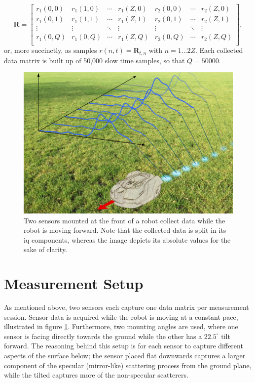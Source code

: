 \begin{equation}
	\mathbf{R}= 
	\begin{bmatrix}
		r_1(0,0) & r_1(1,0) & \cdots & r_1(Z,0) & r_2(0,0) & \cdots & r_2(Z,0) \\
		r_1(0,1) & r_1(1,1) & \cdots & r_1(Z,1) & r_2(0,1) & \cdots & r_2(Z,1) \\
		\vdots &  \vdots & \ddots & \vdots & \vdots & \ddots &  \vdots \\
		r_1(0,Q) & r_1(0,Q) & \cdots  & r_1(Z,Q) & r_2(0,Q) & \cdots  & r_2(Z,Q) \\
	\end{bmatrix}
	,
\end{equation}
or, more succinctly, as samples $r(n,t) = \mathbf{R}_{t,n}$ with $n=1...2Z$. Each collected data matrix is built up of 50,000 slow time samples, so that $Q=50000$.

\begin{figure}
	\centering
	\includegraphics[scale=0.60]{figs_temp/data_collecting.jpg}
	\caption{Two sensors mounted at the front of a robot collect data while the robot is moving forward. Note that the collected data is split in its \gls{iq} components, whereas the image depicts its absolute values for the sake of clarity.}
	\label{fig:data_collecting}
\end{figure}

\section{Measurement Setup}

As mentioned above, two sensors each capture one data matrix per measurement session. Sensor data is acquired while the robot is moving at a constant pace, illustrated in figure \ref{fig:data_collecting}. Furthermore, two mounting angles are used, where one sensor is facing directly towards the ground while the other has a $22.5^\circ$ tilt forward. The reasoning behind this setup is for each sensor to capture different aspects of the surface below; the sensor placed flat downwards captures a larger component of the specular (mirror-like) scattering process from the ground plane, while the tilted captures more of the non-specular scatterers. 


